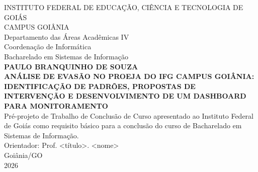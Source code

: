 \documentclass[12pt,a4paper]{article}
\begin{document}
\begin{titlepage}
  \begin{center}
    \uppercase{Instituto Federal de Educação, Ciência e Tecnologia de Goiás}\\
    \uppercase{Campus Goiânia}\\
    Departamento das Áreas Acadêmicas IV\\
    Coordenação de Informática\\
    Bacharelado em Sistemas de Informação\\[2.5cm]

    \textbf{PAULO BRANQUINHO DE SOUZA}\\[3.5cm]

    \textbf{\uppercase{Análise de evasão no PROEJA do IFG Campus Goiânia: identificação de padrões, propostas de intervenção e desenvolvimento de um dashboard para monitoramento}}\\[3.5cm]

    Pré-projeto de Trabalho de Conclusão de Curso apresentado ao Instituto Federal de Goiás como requisito básico para a conclusão do curso de Bacharelado em Sistemas de Informação.\\[1cm]

    Orientador: Prof. <título>. <nome>\\[3cm]

    Goiânia/GO\\
    2026
  \end{center}
\end{titlepage}

\newpage
\thispagestyle{empty}
\vspace*{\fill}
\begin{center}
\end{center}
\end{document}

